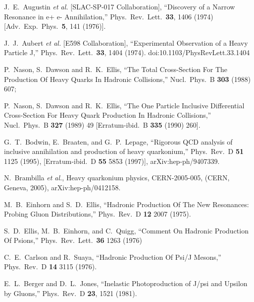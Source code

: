 \documentclass[aps,prc,preprint,superscriptaddress,showpacs,showkeys,amsmath]{revtex4-1}
\begin{document}




\noindent
\begin{thebibliography}{100}
\medskip

  J.~E.~Augustin {\it et al.} [SLAC-SP-017 Collaboration],
  ``Discovery of a Narrow Resonance in e+ e- Annihilation,''
  Phys.\ Rev.\ Lett.\  {\bf 33}, 1406 (1974)
  [Adv.\ Exp.\ Phys.\  {\bf 5}, 141 (1976)].

  J.~J.~Aubert {\it et al.} [E598 Collaboration],
  ``Experimental Observation of a Heavy Particle J,''
  Phys.\ Rev.\ Lett.\  {\bf 33}, 1404 (1974).
  doi:10.1103/PhysRevLett.33.1404
  
  P.~Nason, S.~Dawson and R.~K.~Ellis,
  ``The Total Cross-Section For The Production Of Heavy Quarks In Hadronic Collisions,''
  Nucl.\ Phys.\ B {\bf 303} (1988) 607;
  
  P.~Nason, S.~Dawson and R.~K.~Ellis,
  ``The One Particle Inclusive Differential Cross-Section For Heavy Quark Production In Hadronic Collisions,''
  Nucl.\ Phys.\ B {\bf 327} (1989) 49
  [Erratum-ibid.\ B {\bf 335} (1990) 260].

G.~T.~Bodwin, E.~Braaten, and G.~P.~Lepage,
``Rigorous QCD analysis of inclusive annihilation and production of heavy
quarkonium,''
Phys.\ Rev.\ D {\bf 51} 1125 (1995), 
[Erratum-ibid.\ D {\bf 55} 5853 (1997)],
arXiv:hep-ph/9407339.

  N.~Brambilla {\it et al.},
  Heavy quarkonium physics,
  CERN-2005-005, (CERN, Geneva, 2005),
   arXiv:hep-ph/0412158.

  M.~B.~Einhorn and S.~D.~Ellis,
  ``Hadronic Production Of The New Resonances: Probing Gluon Distributions,''
  Phys.\ Rev.\  D {\bf 12} 2007 (1975).

  S.~D.~Ellis, M.~B.~Einhorn, and C.~Quigg,
  ``Comment On Hadronic Production Of Psions,''
  Phys.\ Rev.\ Lett.\  {\bf 36} 1263 (1976)

  C.~E.~Carlson and R.~Suaya,
  ``Hadronic Production Of Psi/J Mesons,''
  Phys.\ Rev.\  D {\bf 14} 3115 (1976).
  
  E.~L.~Berger and D.~L.~Jones,
  ``Inelastic Photoproduction of J/psi and Upsilon by Gluons,''
  Phys.\ Rev.\ D {\bf 23}, 1521 (1981).


\end{thebibliography}
\end{document}
